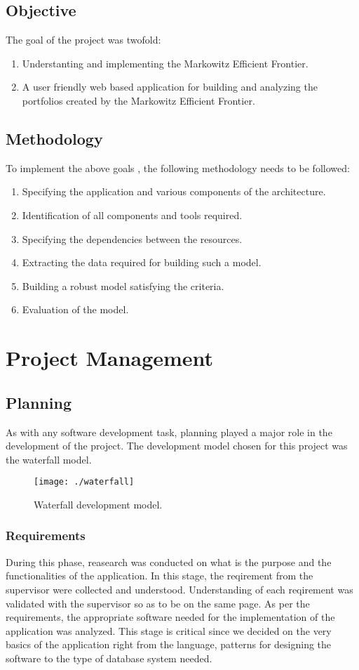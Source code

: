 \subsection{Objective}
The goal of the project was twofold:
\begin{enumerate}
 \item Understanting and implementing the Markowitz Efficient Frontier. 
 \item A user friendly web based application for building and analyzing the portfolios created by the Markowitz Efficient Frontier.
\end{enumerate}
\subsection{Methodology}
To implement the above goals , the following methodology needs to be followed:
\begin{enumerate}
 \item Specifying the application and various components of the architecture.
 \item Identification of all components and tools required.
 \item Specifying the dependencies between the resources.
 \item Extracting the data required for building such a model.
 \item Building a robust model satisfying the criteria.
 \item Evaluation of the model.
\end{enumerate}

\section{Project Management}
\subsection{Planning}
As with any software development task, planning played a major role in the development of the project. The development model chosen for this project was the waterfall model.\\
\clearpage
\begin{figure}[h]
\centering
\texttt{[image: ./waterfall]}
\caption{Waterfall development model.}
\label{fig:waterfall}
\end{figure}
\subsubsection{Requirements}
During this phase, reasearch was conducted on what is the purpose and the functionalities of the application. In this stage, the reqirement from the supervisor were collected and understood. Understanding of each reqirement was validated with the supervisor so as to be on the same page. As per the requirements, the appropriate software needed for the implementation of the application was analyzed. This stage is critical since we decided on the very basics of the application right from the language, patterns for designing the software to the type of database system needed.
